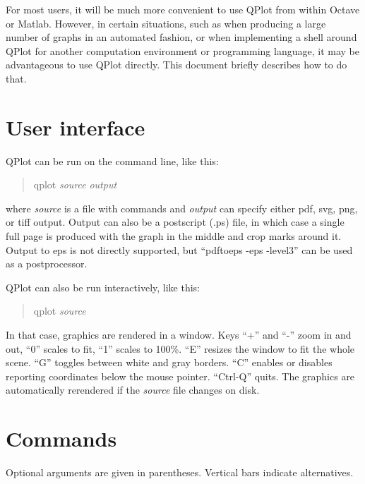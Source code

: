 \documentclass[11pt]{article}
\begin{document}
\begin{centering}
\medskip

\bigskip

\end{centering}

\noindent For most users, it will be much more convenient to use QPlot from
within Octave or Matlab. However, in certain situations, such as when
producing a large number of graphs in an automated fashion, or when
implementing a shell around QPlot for another computation environment
or programming language, it may be advantageous to use QPlot
directly. This document briefly describes how to do that.

\section{User interface}

QPlot can be run on the command line, like this:
\begin{quotation}
qplot \emph{source} \emph{output}
\end{quotation}
 where \emph{source} is a file with commands and
\emph{output} can specify either pdf, svg, png, or tiff output. Output
can also be a postscript (.ps) file, in which case a single full page
is produced with the graph in the middle and crop marks around
it. Output to eps is not directly supported, but ``pdftoeps -eps -level3'' can
be used as a postprocessor.

QPlot can also be run interactively, like this:
\begin{quotation}
qplot \emph{source}
\end{quotation}
 In that case, graphics are rendered in a window. Keys ``+''
and ``-'' zoom in and out, ``0'' scales to fit, ``1'' scales to
100\%. ``E'' resizes the window to fit the whole scene. ``G'' toggles
between white and gray borders. ``C'' enables or disables reporting
coordinates below the mouse pointer. ``Ctrl-Q'' quits. The graphics are
automatically rerendered if the \emph{source}
file changes on disk.



\section{Commands}
Optional arguments are given in parentheses. Vertical bars indicate
alternatives.\bigskip
\end{document}
